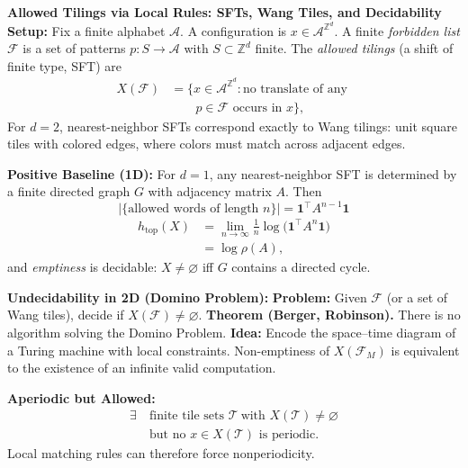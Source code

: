 \begin{technical}
{\Large\textbf{Allowed Tilings via Local Rules: SFTs, Wang Tiles, and Decidability}}\\[0.3em]

\noindent\textbf{Setup:} Fix a finite alphabet $\mathcal{A}$. A configuration is $x\in\mathcal{A}^{\mathbb{Z}^d}$.  
A finite \emph{forbidden list} $\mathcal{F}$ is a set of patterns $p:S\to\mathcal{A}$ with $S\subset\mathbb{Z}^d$ finite.  
The \emph{allowed tilings} (a shift of finite type, SFT) are
\begin{align*}
X(\mathcal{F}) &= \bigl\{ x\in\mathcal{A}^{\mathbb{Z}^d} : \text{no translate of any } \\
    & \qquad p\in\mathcal{F} \text{ occurs in } x \bigr\},
\end{align*}
\vspace{0.5em}
For $d=2$, nearest-neighbor SFTs correspond exactly to Wang tilings: unit square tiles with colored edges, where colors must match across adjacent edges.

\noindent\textbf{Positive Baseline (1D):}  
For $d=1$, any nearest-neighbor SFT is determined by a finite directed graph $G$ with adjacency matrix $A$. Then
\[
|\{\text{allowed words of length } n\}| = \mathbf{1}^\top A^{n-1} \mathbf{1}
\]
\vspace{0.25em}
\begin{align*}
h_{\text{top}}(X) &= \lim_{n\to\infty} \frac{1}{n} \log \bigl( \mathbf{1}^\top A^{n} \mathbf{1} \bigr) \\
    &= \log \rho(A),
\end{align*}
and \emph{emptiness} is decidable: $X\neq\varnothing$ iff $G$ contains a directed cycle.

\noindent\textbf{Undecidability in 2D (Domino Problem):}  
\textbf{Problem:} Given $\mathcal{F}$ (or a set of Wang tiles), decide if $X(\mathcal{F})\neq\varnothing$.  
\textbf{Theorem (Berger, Robinson).} There is no algorithm solving the Domino Problem.  
\textbf{Idea:} Encode the space–time diagram of a Turing machine with local constraints. Non-emptiness of $X(\mathcal{F}_M)$ is equivalent to the existence of an infinite valid computation.

\noindent\textbf{Aperiodic but Allowed:}
\begin{align*}
\exists\ &\text{finite tile sets } \mathcal{T}\ \text{with }X(\mathcal{T})\neq\varnothing \\
 &\text{but no }x\in X(\mathcal{T})\text{ is periodic}.
\end{align*}
Local matching rules can therefore force nonperiodicity.


\end{technical}
